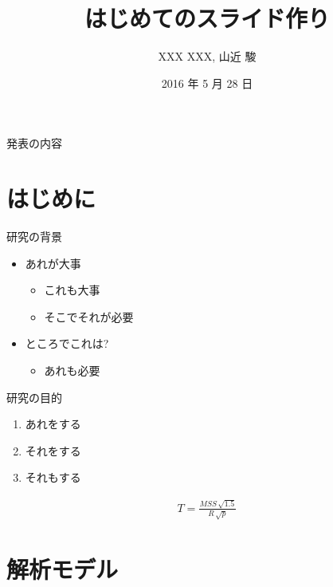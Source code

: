 \documentclass[compress,dvipdfmx,11pt]{beamer}
\title[2025年 大崎研究室ゼミ]{\bf はじめてのスライド作り}
\author[]{XXX XXX, 山近 駿}
\institute{関西学院大学 工学部 情報工学課程}
\date{2016 年 5 月 28 日}
\begin{document}
\maketitle
\begin{frame}{発表の内容}
\tableofcontents
\end{frame}

\newcommand{\pivec}{\mathbf \pi}
\newcommand{\xvec}{\mathbf x}
\newcommand{\yvec}{\mathbf y}
\newcommand{\zvec}{\mathbf z}
\newcommand{\Emat}{\mathbf E}
\newcommand{\Imat}{\mathbf I}

\bf

\section{はじめに}
\label{sec:org0f109a5}

\begin{frame}[label={sec:orge203cf1}]{研究の背景}
\begin{itemize}
\item あれが大事
\begin{itemize}
\item これも大事
\item そこでそれが必要
\end{itemize}
\item ところでこれは?
\begin{itemize}
\item あれも必要
\end{itemize}
\end{itemize}
\end{frame}

\begin{frame}[label={sec:org22aa2db}]{研究の目的}
\begin{enumerate}
\item あれをする
\item それをする
\item それもする
\end{enumerate}
\begin{align}
T = \frac{MSS \, \sqrt{1.5}}{R \, \sqrt{p}}
\end{align}
\end{frame}

\section{解析モデル}
\label{sec:orgd6eb59f}
\end{document}
